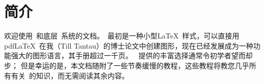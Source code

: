 \section{简介}


欢迎使用\tikzname\ 和底层\pgfname\ 系统的文档。\tikzname\ 最初是一种小型\LaTeX\ 样式，可以直接用pdf\LaTeX\ 在我（Till Tantau）的博士论文中创建图形，现在已经发展成为一种功能强大的图形语言，其手册超过一千页。  \tikzname\ 提供的丰富选择通常令初学者望而却步； 但是幸运的是，本文档随附了一些节奏缓慢的教程，这些教程将教您几乎所有有关\tikzname\ 的知识，而无需阅读其余内容。


